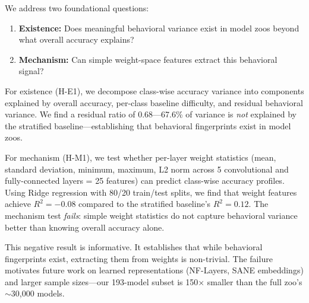 We address two foundational questions:

\begin{enumerate}
    \item \textbf{Existence:} Does meaningful behavioral variance exist in model zoos beyond what overall accuracy explains?
    \item \textbf{Mechanism:} Can simple weight-space features extract this behavioral signal?
\end{enumerate}

For existence (H-E1), we decompose class-wise accuracy variance into components explained by overall accuracy, per-class baseline difficulty, and residual behavioral variance. We find a residual ratio of 0.68---67.6\% of variance is \emph{not} explained by the stratified baseline---establishing that behavioral fingerprints exist in model zoos.

For mechanism (H-M1), we test whether per-layer weight statistics (mean, standard deviation, minimum, maximum, L2 norm across 5 convolutional and fully-connected layers = 25 features) can predict class-wise accuracy profiles. Using Ridge regression with 80/20 train/test splits, we find that weight features achieve $R^2 = -0.08$ compared to the stratified baseline's $R^2 = 0.12$. The mechanism test \emph{fails}: simple weight statistics do not capture behavioral variance better than knowing overall accuracy alone.

This negative result is informative. It establishes that while behavioral fingerprints exist, extracting them from weights is non-trivial. The failure motivates future work on learned representations (NF-Layers, SANE embeddings) and larger sample sizes---our 193-model subset is 150$\times$ smaller than the full zoo's $\sim$30,000 models.
